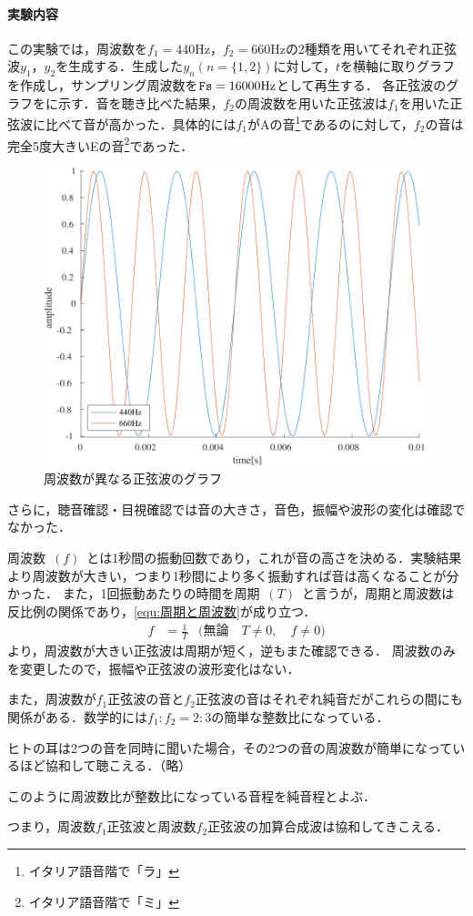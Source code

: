 \paragraph{実験内容}この実験では，周波数を\(f_1=440\textrm{Hz}\)，\(f_2=660\textrm{Hz}\)の2種類を用いてそれぞれ正弦波\(y_1\)，\(y_2\)を生成する．生成した\(y_n(n=\{1,2\})\)に対して，\(t\)を横軸に取りグラフを作成し，サンプリング周波数を\(\textrm{\texttt{Fs}}=16000\textrm{Hz}\)として再生する．
\result
各正弦波のグラフをに示す．音を聴き比べた結果，\(f_2\)の周波数を用いた正弦波は\(f_1\)を用いた正弦波に比べて音が高かった．具体的には\(f_1\)がAの音\footnote{イタリア語音階で「ラ」}であるのに対して，\(f_2\)の音は完全5度大きいEの音\footnote{イタリア語音階で「ミ」}であった．
\begin{figure}
    \includegraphics[keepaspectratio,width=.3\textwidth]{../../Figures/01_01.pdf}
    \caption{周波数が異なる正弦波のグラフ}
    \label{fig:\kadaiaa}
\end{figure}
さらに，聴音確認・目視確認では音の大きさ，音色，振幅や波形の変化は確認でなかった．\par
\consideration 周波数\ \((f)\)\ とは1秒間の振動回数であり，これが音の高さを決める．実験結果より周波数が大きい，つまり1秒間により多く振動すれば音は高くなることが分かった．
また，1回振動あたりの時間を周期\ \((T)\)\ と言うが，周期と周波数は反比例の関係であり，\eqref{equ:周期と周波数}が成り立つ．
\begin{align}
    f & =\frac{1}{T} & \big(\textrm{無論}\quad T\neq 0,\quad f\neq 0\big)\label{equ:周期と周波数}
\end{align}
より，周波数が大きい正弦波は周期が短く，逆もまた確認できる．
周波数のみを変更したので，振幅や正弦波の波形変化はない．\par
また，周波数が\(f_1\)正弦波の音と\(f_2\)正弦波の音はそれぞれ純音だがこれらの間にも関係がある．数学的には\(f_1:f_2=2:3\)の簡単な整数比になっている．
\begin{leftbar}
    ヒトの耳は2つの音を同時に聞いた場合，その2つの音の周波数が簡単になっているほど協和して聴こえる．（略）\par
    このように周波数比が整数比になっている音程を純音程とよぶ．\hfill{\cite[p.46,p.47]{音響工学理論基礎}}
\end{leftbar}
つまり，周波数\(f_1\)正弦波と周波数\(f_2\)正弦波の加算合成波は協和してきこえる．
